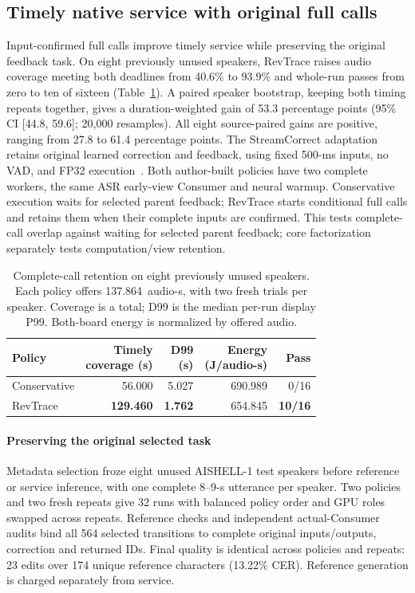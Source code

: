 \subsection{Timely native service with original full calls}
\label{subsec:native_retention_eval}
Input-confirmed full calls improve timely service while preserving the
original feedback task. On eight previously unused speakers, RevTrace
raises audio coverage meeting both deadlines from 40.6\% to 93.9\% and
whole-run passes from zero to ten of sixteen
(Table~\ref{tab:native_full_confirm}). A paired speaker bootstrap,
keeping both timing repeats together, gives a duration-weighted gain
of 53.3 percentage points (95\% CI [44.8, 59.6]; 20,000 resamples).
All eight source-paired gains are positive, ranging from 27.8 to 61.4
percentage points.
The StreamCorrect adaptation retains
original learned correction and feedback, using fixed 500-ms inputs,
no VAD, and FP32 execution~\cite{vu2026streamcorrect}. Both author-built
policies have two complete workers, the same ASR early-view Consumer and
neural warmup. Conservative execution waits for selected parent feedback;
RevTrace starts conditional full calls and retains them when their
complete inputs are confirmed. This tests complete-call overlap against
waiting for selected parent feedback; core factorization separately tests
computation/view retention.

\begin{table}[t]
\centering
\caption{Complete-call retention on eight previously unused speakers.
Each policy offers 137.864~audio-s, with two fresh trials per speaker.
Coverage is a total; D99 is the median per-run display P99.
Both-board energy is normalized by offered audio.}
\label{tab:native_full_confirm}
\small\setlength{\tabcolsep}{3pt}
\begin{tabular}{@{}lrrrr@{}}
\toprule
Policy & \shortstack{Timely\\coverage (s)} & \shortstack{D99\\(s)} &
\shortstack{Energy\\(J/audio-s)} & Pass\\
\midrule
Conservative & 56.000 & 5.027 & 690.989 & 0/16\\
RevTrace & \textbf{129.460} & \textbf{1.762} & 654.845 & \textbf{10/16}\\
\bottomrule
\end{tabular}
\end{table}

\paragraph{Preserving the original selected task}
Metadata selection froze eight unused AISHELL-1 test speakers
\cite{bu2017aishell} before reference or service inference, with one complete
8--9-s utterance per speaker. Two policies and two fresh repeats give
32 runs with balanced policy order and GPU roles swapped across repeats.
Reference checks and independent actual-Consumer audits bind all 564
selected transitions to complete original inputs/outputs, correction and
returned IDs. Final quality is identical across policies and repeats:
23 edits over 174 unique reference characters (13.22\% CER).
Reference generation is charged separately from service.

